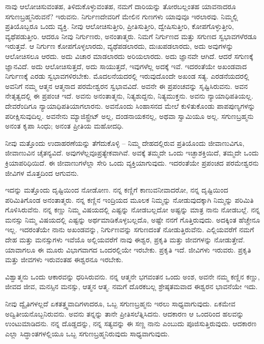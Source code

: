 ನಾವು ಆಲೋಚಿಸುವಂತಹ, ತಿಳಿದುಕೊಳ್ಳುವಂತಹ, ನಮಗೆ ದಾರಿಯನ್ನು ತೋರಬಲ್ಲಂತಹ ಯಾವನಾದರೂ ಸಗುಣಬ್ರಹ್ಮನಿರುವನೆ? ಇರುವನು. ನಿರ್ಗುಣದೇವರಿಗೆ ಮೇಲಿನ ಗುಣಗಳು ಯಾವುವೂ ಇರಲಾರವು. ನಿಮ್ಮಲ್ಲಿ ಪ್ರತಿಯೊಬ್ಬರೂ ಒಂದು ವ್ಯಕ್ತಿ. ನೀವು ಆಲೋಚಿಸುತ್ತೀರಿ, ಪ್ರೀತಿಸುತ್ತೀರಿ, ದ್ವೇಷಿಸುತ್ತೀರಿ, ಕೋಪಗೊಳ್ಳುತ್ತೀರಿ, ವ್ಯಥೆಪಡುತ್ತೀರಿ. ಆದರೂ ನೀವು ನಿರ್ಗುಣರು, ಅನಂತಾತ್ಮರು. ನಿಮಗೆ ನಿರ್ಗುಣದ ಮತ್ತು ಸಗುಣದ ಸ್ವಭಾವಗಳೆರಡೂ ಇರುತ್ತವೆ. ಆ ನಿರ್ಗುಣ ಕೋಪಗೊಳ್ಳಲಾರದು, ವ್ಯಥೆಪಡಲಾರದು, ದುಃಖಪಡಲಾರದು, ಅದು ಅವುಗಳನ್ನು ಆಲೋಚಿಸಲೂ ಆರದು. ಅದು ವಿಚಾರ ಮಾಡಲಾರದು ಅರಿಯಲಾರದು. ಅದು ಜ್ಞಾನವೇ ಆಗಿದೆ. ಆದರೆ ಸಗುಣಕ್ಕೆ ಜ್ಞಾನವಿದೆ. ಅದು ಆಲೋಚಿಸುತ್ತದೆ, ಅದು ಸಾಯುತ್ತದೆ, ಇವುಗಳೆಲ್ಲ ಅದಕ್ಕೆ ಇವೆ. ಇದರಂತೆಯೇ ಅಖಂಡವಾದ ನಿರ್ಗುಣಕ್ಕೆ ಎರಡು ಸ್ವಭಾವಗಳಿರಬೇಕು. ಮೊದಲನೆಯದರಲ್ಲಿ ಇರುವುದೊಂದೇ ಅಖಂಡ ಸತ್ಯ. ಎರಡನೆಯದರಲ್ಲಿ ಅವನಿಗೆ ನಮ್ಮ ಆತ್ಮನ ಆತ್ಮನಾದ ಪರಮೇಶ್ವರನ ಸ್ವಭಾವವಿದೆ. ಅವನೇ ಈ ಪ್ರಪಂಚವನ್ನು ಸೃಷ್ಟಿಸಿರುವನು. ಅವನ ನೇತೃತ್ವದಲ್ಲಿ ಈ ಪ್ರಪಂಚ ಇದೆ. ಅವನು ಅನಂತಾತ್ಮನು, ನಿತ್ಯಶುದ್ದನು, ನಿತ್ಯಮುಕ್ತನು. ಅವನು ನ್ಯಾಯಾಧಿಪತಿಯಲ್ಲ. ದೇವರೆಂದಿಗೂ ನ್ಯಾಯಾಧಿಪತಿಯಾಗಲಾರನು. ಅವನೊಂದು ಸಿಂಹಾಸನದ ಮೇಲೆ ಕುಳಿತುಕೊಂಡು ಪಾಪಪುಣ್ಯಗಳನ್ನು ಪರೀಕ್ಷಿಸುವುದಿಲ್ಲ. ಅವನೇನು ಮ್ಯಾಜಿಸ್ಟ್ರೇಟ್ ಅಲ್ಲ, ದಂಡನಾಯಕನಲ್ಲ, ಅಥವಾ ಸ್ವಾಮಿಯೂ ಅಲ್ಲ. ಸಗುಣಬ್ರಹ್ಮನು ಅನಂತ ಕೃಪಾ ಸಿಂಧು; ಅನಂತ ಪ್ರೀತಿಯ ಮಹೋದಧಿ.

ನೀವು ಮತ್ತೊಂದು ಉದಾಹರಣೆಯನ್ನು ತೆಗೆದುಕೊಳ್ಳಿ – ನಿಮ್ಮ ದೇಹದಲ್ಲಿರುವ ಪ್ರತಿಯೊಂದು ಜೀವಾಣುವಿಗೂ, ಜೀವಾಣುವಿನ ಚೈತನ್ಯವಿದೆ. ಅವುಗಳೆಲ್ಲವೂ\break ಪ್ರತ್ಯೇಕವಾಗಿವೆ. ಅವಕ್ಕೆ ತಮ್ಮದೇ ಒಂದು ಇಚ್ಛಾಶಕ್ತಿಯಿದೆ, ತಮ್ಮದೇ ಒಂದು ಕ್ರಿಯಾಪರಿಧಿಯಿದೆ. ಈ ಜೀವಾಣುಗಳೆಲ್ಲಾ ಸೇರಿ ಒಂದು ವ್ಯಕ್ತಿಯಾಗುವುದು. ಇದರಂತೆಯೇ ಪ್ರಪಂಚದ ಪರಮೇಶ್ವರನು ಜೀವಿಗಳ ಮೊತ್ತದಿಂದ ಆಗುವನು.

ಇದನ್ನು ಮತ್ತೊಂದು ದೃಷ್ಟಿಯಿಂದ ನೋಡೋಣ. ನನ್ನ ಕಣ್ಣಿಗೆ ಕಾಣುವ\break ನೀವಾದರೋ, ನನ್ನ ದೃಷ್ಟಿಯಿಂದ ಪರಿಮಿತಿಗೊಂಡ ಅನಂತಾತ್ಮರು. ನನ್ನ ಕಣ್ಣಿನ ಇಂದ್ರಿಯದ ಮೂಲಕ ನಿಮ್ಮನ್ನು ನೋಡುವುದಕ್ಕಾಗಿ ನಿಮ್ಮನ್ನು ಪರಿಮಿತಿ ಗೊಳಿಸಿರುವೆನು. ನನ್ನ ಕಣ್ಣು ನಿಮ್ಮ ವಿಷಯದಲ್ಲಿ ಎಷ್ಟನ್ನು ನೋಡಬಲ್ಲದೋ ಅಷ್ಟನ್ನು ಮಾತ್ರ ನಾನು ನೋಡಬಲ್ಲೆ. ನನ್ನ ಮನಸ್ಸು ನಿಮ್ಮ ವಿಷಯದಲ್ಲಿ ಎಷ್ಟನ್ನು ಅರ್ಥಮಾಡಿಕೊಳ್ಳಬಲ್ಲದೊ, ಅಷ್ಟೇ ನನಗೆ ಗೊತ್ತಿರುವುದು. ಅದಕ್ಕಿಂತ ಹೆಚ್ಚೇನೂ ಇಲ್ಲ. ಇದರಂತೆಯೇ ನಾನು ಅಖಂಡವನ್ನು, ನಿರ್ಗುಣವನ್ನು ಸಗುಣದಂತೆ ನೋಡುತ್ತಿರುವೆನು. ಎಲ್ಲಿಯವರೆಗೆ ನಮಗೆ ದೇಹ ಮತ್ತು ಮನಸ್ಸುಗಳು ಇವೆಯೊ ಅಲ್ಲಿಯವರೆಗೆ ನಾವು ಈಶ್ವರ, ಪ್ರಕೃತಿ ಮತ್ತು ಜೀವಗಳನ್ನು ನೋಡುತ್ತೇವೆ. ಯಾವಾಗಲೂ ಈ ಮೂರು ವಿಭಾಗವಾಗದ ಒಂದರಲ್ಲಿಯೇ ಇರಬೇಕು. ಪ್ರಕೃತಿ ಇದೆ. ಜೀವಿಗಳು ಇರುವರು. ಪ್ರಕೃತಿ ಮತ್ತು ಜೀವಗಳು ಇರುವಂತಹ ಈಶ್ವರನೂ ಇರಬೇಕು.

ವಿಶ್ವಾತ್ಮನು ಒಂದು ಆಕಾರವನ್ನು ಧರಿಸಿರುವನು. ನನ್ನ ಆತ್ಮನೇ ಭಗವಂತನ ಒಂದು ಅಂಶ, ಅವನೇ ನಮ್ಮ ಕಣ್ಣಿನ ಕಣ್ಣು, ಜೀವದ ಜೀವ, ಮನಸ್ಸಿನ ಮನಸ್ಸು, ಆತ್ಮನ ಆತ್ಮ. ನಮಗೆ ದೊರಕಬಲ್ಲ ಶ್ರೇಷ್ಠತಮವಾದ ಈಶ್ವರನ ಭಾವನೆಯೇ ಇದು.

ನೀವು ದ್ವೈತಿಗಳಲ್ಲದೆ ಏಕತತ್ತ್ವವಾದಿಗಳಾದರೂ, ಒಬ್ಬ ಸಗುಣಬ್ರಹ್ಮನು ಇರಲು ಸಾಧ್ಯವಾಗುವುದು. ಏಕಮೇವ ಅದ್ವಿತೀಯನೊಬ್ಬನಿರುವನು. ಅವನು ತನ್ನನ್ನು ತಾನೇ ಪ್ರೀತಿಸಲೆತ್ನಿಸಿದನು. ಆದಕಾರಣ ಆ ಒಂದರಿಂದ ಹಲವನ್ನು ಉಂಟುಮಾಡಿದನು. ನನ್ನ ದೊಡ್ಡದನ್ನು, ನನ್ನ ಸತ್ಯವನ್ನು ಈ ಸಣ್ಣ ನಾನು ಎಂಬುದು ಪೂಜಿಸುತ್ತಿರುವುದು. ಆದಕಾರಣ ಎಲ್ಲಾ ಸಿದ್ಧಾಂತಗಳಲ್ಲಿಯೂ ಒಬ್ಬ ಸಗುಣಬ್ರಹ್ಮನಿರುವುದು ಸಾಧ್ಯವಾಗುವುದು.

